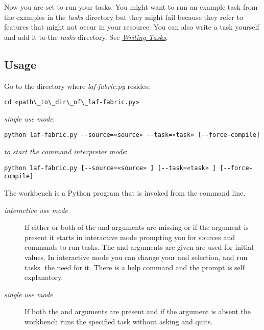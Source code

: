 \documentclass[letterpaper,10pt,english]{sphinxmanual}
\begin{document}
Now you are set to run your tasks.
You might want to run an example task from the examples in the \emph{tasks} directory
but they might fail because they refer to features that might not occur in your resource.
You can also write a task yourself and add it to the \emph{tasks} directory. See {\hyperref[taskwriting::doc]{\emph{Writing Tasks}}}.


\subsection{Usage}
\label{workbench:usage}
Go to the directory where \emph{laf-fabric.py} resides:

\begin{Verbatim}[commandchars=\\\{\}]
cd «path\_to\_dir\_of\_laf-fabric.py»
\end{Verbatim}

\emph{single use mode}:

\begin{Verbatim}[commandchars=\\\{\}]
python laf-fabric.py --source=«source» --task=«task» [--force-compile]
\end{Verbatim}

\emph{to start the command interpreter mode}:

\begin{Verbatim}[commandchars=\\\{\}]
python laf-fabric.py [--source=«source» ] [--task=«task» ] [--force-compile]
\end{Verbatim}

The workbench is a Python program that is invoked from the command line.
\begin{description}
\item[{\emph{interactive use mode}}] \leavevmode
If either or both of the  and  arguments are missing or if the  argument is present
it starts in interactive mode prompting you for sources and commands to run tasks.
The  and  arguments are given are used for initial values.
In interactive mode you can change your  and  selection, and run tasks.
the need for it. There is a help command and the prompt is self explanatory.

\item[{\emph{single use mode}}] \leavevmode
If both the  and  arguments are present and if the  argument is absent
the workbench runs the specified task without asking and quits.

\end{description}
\end{document}
